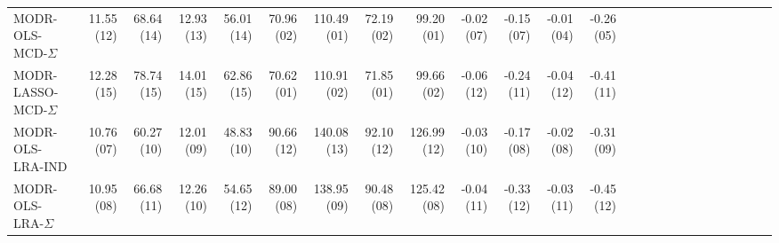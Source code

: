 \begin{tabular}{lrrrrrrrrrrrrrrrrrrrrrrrr}
MODR-OLS-MCD-$\Sigma$ & {\cellcolor[HTML]{FAE8DE}} \color[HTML]{000000} 11.55 (12) & {\cellcolor[HTML]{DD7059}} \color[HTML]{F1F1F1} 68.64 (14) & {\cellcolor[HTML]{F9F0EB}} \color[HTML]{000000} 12.93 (13) & {\cellcolor[HTML]{D25849}} \color[HTML]{F1F1F1} 56.01 (14) & {\cellcolor[HTML]{08366A}} \color[HTML]{F1F1F1} 70.96 (02) & {\cellcolor[HTML]{053061}} \color[HTML]{F1F1F1} 110.49 (01) & {\cellcolor[HTML]{08366A}} \color[HTML]{F1F1F1} 72.19 (02) & {\cellcolor[HTML]{053061}} \color[HTML]{F1F1F1} 99.20 (01) & {\cellcolor[HTML]{0F437B}} \color[HTML]{F1F1F1} -0.02 (07) & {\cellcolor[HTML]{3A87BD}} \color[HTML]{F1F1F1} -0.15 (07) & {\cellcolor[HTML]{09386D}} \color[HTML]{F1F1F1} -0.01 (04) & {\cellcolor[HTML]{4997C5}} \color[HTML]{F1F1F1} -0.26 (05) \\
MODR-LASSO-MCD-$\Sigma$ & {\cellcolor[HTML]{DE735C}} \color[HTML]{F1F1F1} 12.28 (15) & {\cellcolor[HTML]{960F27}} \color[HTML]{F1F1F1} 78.74 (15) & {\cellcolor[HTML]{DA6853}} \color[HTML]{F1F1F1} 14.01 (15) & {\cellcolor[HTML]{900D26}} \color[HTML]{F1F1F1} 62.86 (15) & {\cellcolor[HTML]{053061}} \color[HTML]{F1F1F1} 70.62 (01) & {\cellcolor[HTML]{073467}} \color[HTML]{F1F1F1} 110.91 (02) & {\cellcolor[HTML]{053061}} \color[HTML]{F1F1F1} 71.85 (01) & {\cellcolor[HTML]{073467}} \color[HTML]{F1F1F1} 99.66 (02) & {\cellcolor[HTML]{1F63A8}} \color[HTML]{F1F1F1} -0.06 (12) & {\cellcolor[HTML]{8AC0DB}} \color[HTML]{000000} -0.24 (11) & {\cellcolor[HTML]{185493}} \color[HTML]{F1F1F1} -0.04 (12) & {\cellcolor[HTML]{D4E6F1}} \color[HTML]{000000} -0.41 (11) \\
MODR-OLS-LRA-IND & {\cellcolor[HTML]{93C6DE}} \color[HTML]{000000} 10.76 (07) & {\cellcolor[HTML]{FBCEB7}} \color[HTML]{000000} 60.27 (10) & {\cellcolor[HTML]{87BEDA}} \color[HTML]{000000} 12.01 (09) & {\cellcolor[HTML]{F8BDA1}} \color[HTML]{000000} 48.83 (10) & {\cellcolor[HTML]{F8BDA1}} \color[HTML]{000000} 90.66 (12) & {\cellcolor[HTML]{FAE8DE}} \color[HTML]{000000} 140.08 (13) & {\cellcolor[HTML]{F8BB9E}} \color[HTML]{000000} 92.10 (12) & {\cellcolor[HTML]{F9EEE7}} \color[HTML]{000000} 126.99 (12) & {\cellcolor[HTML]{134C87}} \color[HTML]{F1F1F1} -0.03 (10) & {\cellcolor[HTML]{4695C4}} \color[HTML]{F1F1F1} -0.17 (08) & {\cellcolor[HTML]{0D3F76}} \color[HTML]{F1F1F1} -0.02 (08) & {\cellcolor[HTML]{81BAD8}} \color[HTML]{000000} -0.31 (09) \\
MODR-OLS-LRA-$\Sigma$ & {\cellcolor[HTML]{BBDAEA}} \color[HTML]{000000} 10.95 (08) & {\cellcolor[HTML]{E8896C}} \color[HTML]{F1F1F1} 66.68 (11) & {\cellcolor[HTML]{B3D6E8}} \color[HTML]{000000} 12.26 (10) & {\cellcolor[HTML]{DB6B55}} \color[HTML]{F1F1F1} 54.65 (12) & {\cellcolor[HTML]{FCD7C2}} \color[HTML]{000000} 89.00 (08) & {\cellcolor[HTML]{F9EEE7}} \color[HTML]{000000} 138.95 (09) & {\cellcolor[HTML]{FCD5BF}} \color[HTML]{000000} 90.48 (08) & {\cellcolor[HTML]{F7F5F4}} \color[HTML]{000000} 125.42 (08) & {\cellcolor[HTML]{185493}} \color[HTML]{F1F1F1} -0.04 (11) & {\cellcolor[HTML]{D2E6F0}} \color[HTML]{000000} -0.33 (12) & {\cellcolor[HTML]{114781}} \color[HTML]{F1F1F1} -0.03 (11) & {\cellcolor[HTML]{E7F0F4}} \color[HTML]{000000} -0.45 (12) \\

\end{tabular}
